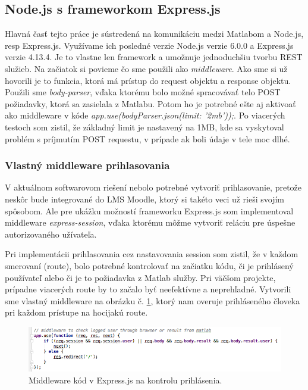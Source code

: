 
\subsection{Node.js s frameworkom Express.js}
Hlavná časť tejto práce je sústredená na komunikáciu medzi Matlabom a Node.js, resp Express.js. Využívame ich posledné verzie Node.js verzie 6.0.0 a Express.js verzie 4.13.4. Je to vlastne len framework a umožnuje jednoduchšiu tvorbu REST služieb. Na začiatok si povieme čo sme použili ako \textit{middleware}. Ako sme si už hovorili je to funkcia, ktorá má prístup do request objektu a response objektu. Použili sme \textit{body-parser}, vďaka ktorému bolo možné spracovávať telo POST požiadavky, ktorá sa zasielala z Matlabu. Potom ho je potrebné ešte aj aktivoať ako middleware v kóde \textit{app.use(bodyParser.json({limit: '2mb'}));}. Po viacerých testoch som zistil, že základný limit je nastavený na 1MB, kde sa vyskytoval problém s príjmutím POST requestu, v prípade ak boli údaje v tele moc dlhé.

\subsubsection{Vlastný middleware prihlasovania}
V aktuálnom softwarovom riešení nebolo potrebné vytvoriť prihlasovanie, pretože neskôr bude integrované do LMS Moodle, ktorý si takéto veci už rieši svojím spôsobom. Ale pre ukážku možností frameworku Express.js som implementoval middleware \textit{express-session}, vďaka ktorému môžme vytvoriť reláciu pre úspešne autorizovaného užívateľa. 

Pri implementácii prihlasovania cez nastavovania session som zistil, že v každom smerovaní (route), bolo potrebné kontrolovať na začiatku kódu, či je prihlásený používateľ alebo či je to požiadavka z Matlab služby. Pri väčšom projekte, prípadne viacerých route by to začalo byť neefektívne a neprehľadné. Vytvorili sme vlastný middleware na obrázku č. \ref{img-express-middleware}, ktorý nam overuje prihláseného človeka pri každom prístupe na hocijakú route.

\begin{figure}[H]
  \centering
  \includegraphics[scale=0.6]{img/code/express-middleware.png}
  \caption{Middleware kód v Express.js na kontrolu prihlásenia.}
  \label{img-express-middleware}
\end{figure}

